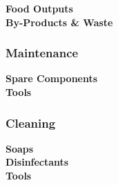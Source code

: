 \textbf{Food Outputs}\\


\textbf{By-Products \& Waste}\\


\subsubsection{Maintenance}

\textbf{Spare Components}\\


\textbf{Tools}\\


\subsubsection{Cleaning}

\textbf{Soaps}\\


\textbf{Disinfectants}\\


\textbf{Tools}\\

